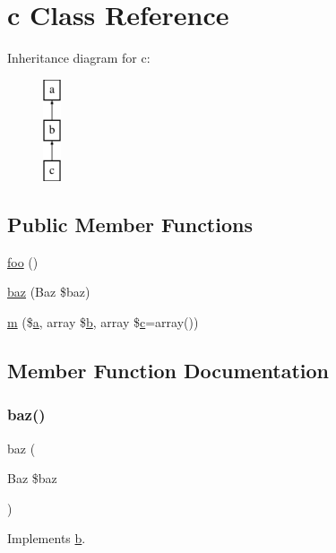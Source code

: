 \hypertarget{classc}{}\section{c Class Reference}
\label{classc}
Inheritance diagram for c\+:\begin{figure}[H]
\begin{center}
\leavevmode
\includegraphics[height=3.000000cm]{classc}
\end{center}
\end{figure}
\subsection*{Public Member Functions}
\begin{DoxyCompactItemize}
\item 
\mbox{\hyperlink{classc_a79418a120498dd9cf915655654607747}{foo}} ()
\item 
\mbox{\hyperlink{classc_a9ee3f93f7e7aaa109f0f7f5abab35acc}{baz}} (Baz \$baz)
\item 
\mbox{\hyperlink{classc_a0fd5ec041a095f0feb67e713f0685716}{m}} (\$\mbox{\hyperlink{interfacea}{a}}, array \$\mbox{\hyperlink{interfaceb}{b}}, array \$\mbox{\hyperlink{classc}{c}}=array())
\end{DoxyCompactItemize}


\subsection{Member Function Documentation}
\mbox{\label{classc_a9ee3f93f7e7aaa109f0f7f5abab35acc}} 
\subsubsection{\texorpdfstring{baz()}{baz()}}
{\footnotesize\ttfamily baz (\begin{DoxyParamCaption}\item[{Baz}]{\$baz }\end{DoxyParamCaption})}



Implements \mbox{\hyperlink{interfaceb_a9ee3f93f7e7aaa109f0f7f5abab35acc}{b}}.

